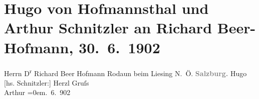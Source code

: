

         
         \renewcommand{\erwaehntePersonen}{Personen: Richard Beer-Hofmann}
         \renewcommand{\erwaehnteOrte}{Orte: Hauptbahnhof Salzburg, Niederösterreich, Rodaun, Salzburg}
         \renewcommand{\erwaehnteWerke}{}
               \section[Hugo von Hofmannsthal und Arthur Schnitzler an Richard Beer-Hofmann, 30. 6. 1902]{ Hugo von Hofmannsthal und Arthur Schnitzler an Richard Beer-Hofmann,
               30. 6. 1902}\nopagebreak{}\rehead{ }\begin{ledgroupsized}[t]{13cm}\normalsize\beginnumbering \toendnotes[C]{\smallbreak\pagebreak[2]} 
\pstart{}{\pb}Herrn D\textsuperscript{r} Richard Beer
                  Hofmann \pend{}\pstart{}Rodaun beim Liesing \pend{}\pstart{}N. Ö.\pend{}{\bigskip}\pstart
           \noindent{}\centering{}\textcolor{gray}{\textbf{{\pb}Salzburg.}}\pend
           \pstart \spacefill\mbox{Hugo}\pend{}\pstart
           {[}hs. Schnitzler:{]} Herzl Gruſs{\\[\baselineskip]}\spacefill\mbox{Arthur}\pend
           \leftskip=0em{}. 6. 902\pend
           
         
         \endnumbering{}\end{ledgroupsized}  \newcommand{\dateiname}{L01226}\newcommand{\titel}{Hugo von Hofmannsthal und Arthur Schnitzler an Richard Beer-Hofmann, 30. 6. 1902}\newcommand{\editorInnen}{Martin Anton Müller und Gerd-Hermann Susen}
      